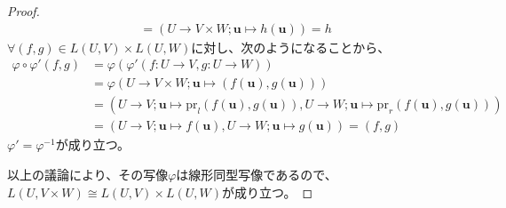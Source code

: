 \documentclass[dvipdfmx]{jsarticle}
\begin{document}
\begin{proof}
\begin{align*}
&= \left( U \rightarrow V \times W;\mathbf{u} \mapsto h\left( \mathbf{u} \right) \right) = h
\end{align*}
$\forall(f,g) \in L(U,V) \times L(U,W)$に対し、次のようになることから、
\begin{align*}
\varphi \circ \varphi'(f,g) &= \varphi\left( \varphi'(f:U \rightarrow V,g:U \rightarrow W) \right)\\
&= \varphi\left( U \rightarrow V \times W;\mathbf{u} \mapsto \left( f\left( \mathbf{u} \right),g\left( \mathbf{u} \right) \right) \right)\\
&= \left( U \rightarrow V;\mathbf{u} \mapsto \mathrm{pr}_{l}\left( f\left( \mathbf{u} \right),g\left( \mathbf{u} \right) \right),U \rightarrow W;\mathbf{u} \mapsto \mathrm{pr}_{r}\left( f\left( \mathbf{u} \right),g\left( \mathbf{u} \right) \right) \right)\\
&= \left( U \rightarrow V;\mathbf{u} \mapsto f\left( \mathbf{u} \right),U \rightarrow W;\mathbf{u} \mapsto g\left( \mathbf{u} \right) \right) = (f,g)
\end{align*}
$\varphi' = \varphi^{- 1}$が成り立つ。\par
以上の議論により、その写像$\varphi$は線形同型写像であるので、$L(U,V \times W) \cong L(U,V) \times L(U,W)$が成り立つ。
\end{proof}
\end{document}
